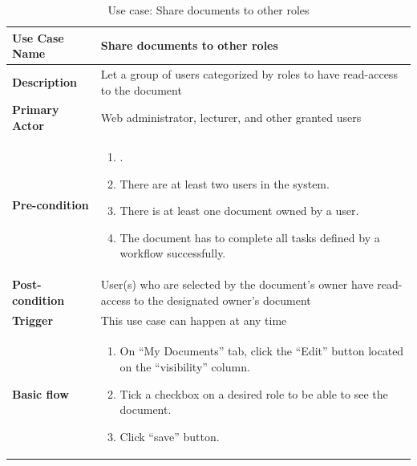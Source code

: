 \begin{table}
	\centering
	\caption{Use case: Share documents to other roles}
	\begin{tabular}{|l|L{9cm}|}
		\hline
		\textbf{Use Case Name} & Share documents to other roles \\
		\hline
		
		\textbf{Description} & Let a group of users categorized by roles to have read-access to the document \\
		\textbf{Primary Actor} & Web administrator, lecturer, and other granted users \\
		\textbf{Pre-condition} & 
		\begin{enumerate}
			\item \alreadylogin.
			\item There are at least two users in the system.
			\item There is at least one document owned by a user.
			\item The document has to complete all tasks defined by a workflow successfully.
		\end{enumerate} \\
		\textbf{Post-condition} & User(s) who are selected by the document's owner have read-access to the designated owner's document \\
		\textbf{Trigger} & This use case can happen at any time \\
		\textbf{Basic flow} & 
		\begin{enumerate}
			\item On \enquote{My Documents} tab, click the \enquote{Edit} button located on the \enquote{visibility} column.
			\item Tick a checkbox on a desired role to be able to see the document.
			\item Click \enquote{save} button.
		\end{enumerate} \\
		\hline
	\end{tabular}
\end{table}


